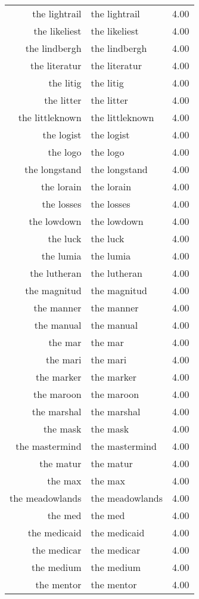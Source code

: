 \begin{table}[ht]
\begin{tabular}{rlr}
  the lightrail & the lightrail & 4.00 \\ 
  the likeliest & the likeliest & 4.00 \\ 
  the lindbergh & the lindbergh & 4.00 \\ 
  the literatur & the literatur & 4.00 \\ 
  the litig & the litig & 4.00 \\ 
  the litter & the litter & 4.00 \\ 
  the littleknown & the littleknown & 4.00 \\ 
  the logist & the logist & 4.00 \\ 
  the logo & the logo & 4.00 \\ 
  the longstand & the longstand & 4.00 \\ 
  the lorain & the lorain & 4.00 \\ 
  the losses & the losses & 4.00 \\ 
  the lowdown & the lowdown & 4.00 \\ 
  the luck & the luck & 4.00 \\ 
  the lumia & the lumia & 4.00 \\ 
  the lutheran & the lutheran & 4.00 \\ 
  the magnitud & the magnitud & 4.00 \\ 
  the manner & the manner & 4.00 \\ 
  the manual & the manual & 4.00 \\ 
  the mar & the mar & 4.00 \\ 
  the mari & the mari & 4.00 \\ 
  the marker & the marker & 4.00 \\ 
  the maroon & the maroon & 4.00 \\ 
  the marshal & the marshal & 4.00 \\ 
  the mask & the mask & 4.00 \\ 
  the mastermind & the mastermind & 4.00 \\ 
  the matur & the matur & 4.00 \\ 
  the max & the max & 4.00 \\ 
  the meadowlands & the meadowlands & 4.00 \\ 
  the med & the med & 4.00 \\ 
  the medicaid & the medicaid & 4.00 \\ 
  the medicar & the medicar & 4.00 \\ 
  the medium & the medium & 4.00 \\ 
  the mentor & the mentor & 4.00 \\ 

\end{tabular}
\end{table}

